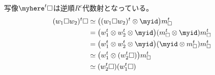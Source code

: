 	写像$\myhere^t\square$は逆順$R^c$代数射となっている。
	\begin{equation*}\begin{split} %
		(w_1\square w_2)^t\square 
		&\simeq \bigl((w_1\square w_2)^t\otimes \myid\bigr)m_\square^t \\
		&= \bigl(w_1^t\otimes w_2^t\otimes \myid\bigr)(m_\square^t\otimes\myid)m_\square^t \\
		&= \bigl(w_1^t\otimes w_2^t\otimes \myid\bigr)(\myid\otimes m_\square^t)m_\square^t \\
		&\simeq \bigl(w_1^t\otimes (w_2^t\square)\bigr)m_\square^t \\
		&\simeq (w_2^t\square)(w_1^t\square) \\
	\end{split}\end{equation*} %

